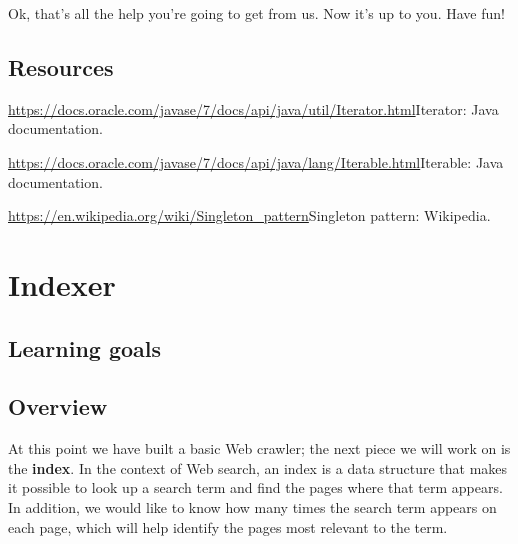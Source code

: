\documentclass[12pt]{book}
\theoremstyle{exercise}
\newcommand{\java}{\verb}%}
\begin{document}
Ok, that's all the help you're going to get from us. Now it's up to you.
Have fun!

\section{Resources}\label{resources-7}

\url{https://docs.oracle.com/javase/7/docs/api/java/util/Iterator.html}{Iterator}:
Java documentation.

\url{https://docs.oracle.com/javase/7/docs/api/java/lang/Iterable.html}{Iterable}:
Java documentation.

\url{https://en.wikipedia.org/wiki/Singleton_pattern}{Singleton
pattern}: Wikipedia. 

\chapter{Indexer}

\section{Learning goals}\label{learning-goals-1}


\section{Overview}\label{overview-9}

At this point we have built a basic Web crawler; the next piece we will
work on is the \textbf{index}. In the context of Web search, an index is
a data structure that makes it possible to look up a search term and
find the pages where that term appears. In addition, we would like to
know how many times the search term appears on each page, which will
help identify the pages most relevant to the term.
\end{document}
